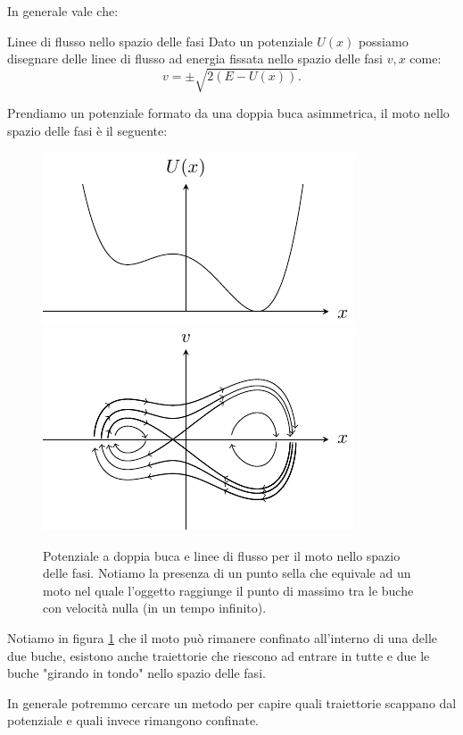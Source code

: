 \noindent
In generale vale che:
\begin{redbox}{Linee di flusso nello spazio delle fasi}
    Dato un potenziale $U(x)$ possiamo disegnare delle linee di flusso ad energia fissata nello spazio delle fasi $v,x$ come:
    \[
	v = \pm \sqrt{2(E-U(x))} 
    .\] 
\end{redbox}
\noindent
\begin{exmp}
Prendiamo un potenziale formato da una doppia buca asimmetrica, il moto nello spazio delle fasi è il seguente:    
\begin{figure}[H]
    \centering
    \includegraphics[width=0.8\columnwidth]{lezioni/tikz/lez_15_doppia_buca.pdf}
    \includegraphics[width=0.8\columnwidth]{lezioni/tikz/lez_15_doppia_buca1.pdf}
    \caption{\scriptsize Potenziale a doppia buca e linee di flusso per il moto nello spazio delle fasi. Notiamo la presenza di un punto sella che equivale ad un moto nel quale l'oggetto raggiunge il punto di massimo tra le buche con velocità nulla (in un tempo infinito). }
    \label{fig:15_double}
\end{figure}
\noindent
%
Notiamo in figura \ref{fig:15_double} che il moto può rimanere confinato all'interno di una delle due buche, esistono anche traiettorie che riescono ad entrare in tutte e due le buche "girando in tondo" nello spazio delle fasi. 
\end{exmp}
\noindent
In generale potremmo cercare un metodo per capire quali traiettorie scappano dal potenziale e quali invece rimangono confinate.
